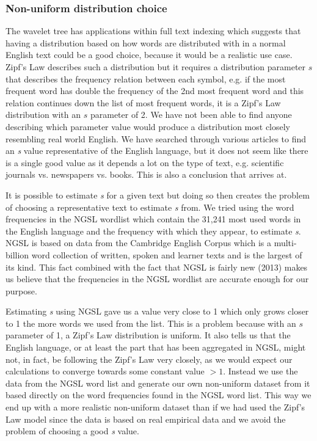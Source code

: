 \subsubsection{Non-uniform distribution choice}
The wavelet tree has applications within full text indexing which suggests that having a distribution based on how words are distributed with in a normal English text could be a good choice, because it would be a realistic use case. 
Zipf's Law describes such a distribution \citep[abstract]{ZipfsLawOnText} but it requires a distribution parameter $s$ that describes the frequency relation between each symbol, e.g. if the most frequent word has double the frequency of the 2nd most frequent word and this relation continues down the list of most frequent words, it is a Zipf's Law distribution with an $s$ parameter of 2.
We have not been able to find anyone describing which parameter value would produce a distribution most closely resembling real world English. 
We have searched through various articles to find an \textit{s} value representative of the English language, but it does not seem like there is a single good value as it depends a lot on the type of text, e.g. scientific journals vs. newspapers vs. books.
This is also a conclusion that \citep[abstract]{ZipfsLawOnText} arrives at.

It is possible to estimate \textit{s} for a given text but doing so then creates the problem of choosing a representative text to estimate \textit{s} from.
We tried using the word frequencies in the NGSL \citep{NGSL} wordlist which contain the 31,241 most used words in the English language and the frequency with which they appear, to estimate \textit{s}.
NGSL is based on data from the Cambridge English Corpus which is a multi-billion word collection of written, spoken and learner texts and is the largest of its kind.
This fact combined with the fact that NGSL is fairly new (2013) makes us believe that the frequencies in the NGSL wordlist are accurate enough for our purpose.

Estimating \textit{s} using NGSL gave us a value very close to 1 which only grows closer to 1 the more words we used from the list.
This is a problem because with an $s$ parameter of 1, a Zipf's Law distribution is uniform.
It also tells us that the English language, or at least the part that has been aggregated in NGSL, might not, in fact, be following the Zipf's Law very closely, as we would expect our calculations to converge towards some constant value $>1$.
Instead we use the data from the NGSL word list and generate our own non-uniform dataset from it based directly on the word frequencies found in the NGSL word list.
This way we end up with a more realistic non-uniform dataset than if we had used the Zipf's Law model since the data is based on real empirical data and we avoid the problem of choosing a good \textit{s} value.


